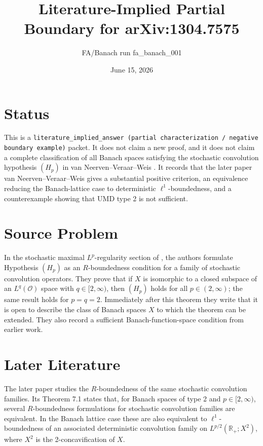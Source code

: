 \documentclass[11pt]{article}
\title{Literature-Implied Partial Boundary for arXiv:1304.7575}
\author{FA/Banach run fa\_banach\_001}
\date{June 15, 2026}
\newcommand{\R}{\mathbb{R}}
\newcommand{\Lp}{L^p}
\begin{document}
\maketitle

\section*{Status}

This is a \texttt{literature\_implied\_answer (partial characterization /
negative boundary example)} packet. It does not claim a new proof, and it does
not claim a complete classification of all Banach spaces satisfying the
stochastic convolution hypothesis $(H_p)$ in van Neerven--Veraar--Weis
\cite{NVWsurvey}. It records that the later paper
van Neerven--Veraar--Weis \cite{NVWrbounded} gives a substantial positive
criterion, an equivalence reducing the Banach-lattice case to deterministic
$\ell^1$-boundedness, and a counterexample showing that UMD type 2 is not
sufficient.

\section*{Source Problem}

In the stochastic maximal $\Lp$-regularity section of \cite{NVWsurvey}, the
authors formulate Hypothesis $(H_p)$ as an $R$-boundedness condition for a
family of stochastic convolution operators. They prove that if $X$ is
isomorphic to a closed subspace of an $L^q(\mathcal O)$ space with
$q\in[2,\infty)$, then $(H_p)$ holds for all $p\in(2,\infty)$; the same result
holds for $p=q=2$. Immediately after this theorem they write that it is open
to describe the class of Banach spaces $X$ to which the theorem can be
extended. They also record a sufficient Banach-function-space condition from
earlier work.

\section*{Later Literature}

The later paper \cite{NVWrbounded} studies the $R$-boundedness of the same
stochastic convolution families. Its Theorem 7.1 states that, for Banach
spaces of type 2 and $p\in[2,\infty)$, several $R$-boundedness formulations
for stochastic convolution families are equivalent. In the Banach lattice case
these are also equivalent to $\ell^1$-boundedness of an associated deterministic
convolution family on $L^{p/2}(\R_+;X^2)$, where $X^2$ is the
2-concavification of $X$.
\end{document}
